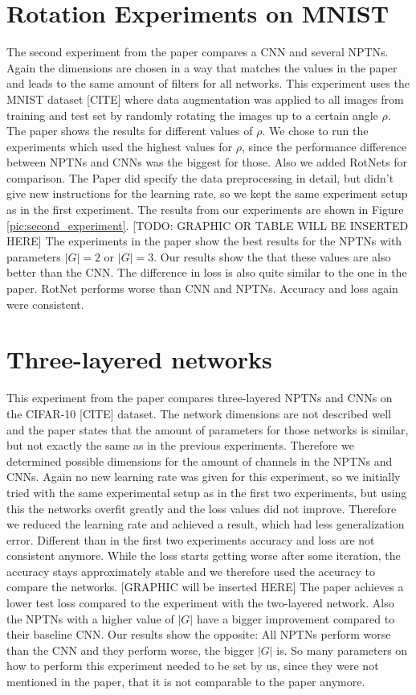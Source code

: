 \documentclass{llncs}
\begin{document}
\section{Rotation Experiments on MNIST}
The second experiment from the paper compares a CNN and several NPTNs. Again the dimensions are chosen in a way that matches the values in the paper and leads to the same amount of filters for all networks. 
This experiment uses the MNIST dataset [CITE] where data augmentation was applied to all images from training and test set by randomly rotating the images up to a certain angle $\rho$. 
The paper shows the results for different values of $\rho$. We chose to run the experiments which used the highest values for $\rho$, since the performance difference between NPTNs and CNNs was the biggest for those. Also we added RotNets for comparison.
The Paper did specify the data preprocessing in detail, but didn't give new instructions for the learning rate, so we kept the same experiment setup as in the first experiment.
The results from our experiments are shown in Figure \ref{pic:second_experiment}. 
[TODO: GRAPHIC OR TABLE WILL BE INSERTED HERE]
The experiments in the paper show the best results for the NPTNs with parameters $|G|=2$ or $|G|=3$. Our results show the that these values are also better than the CNN. The difference in loss is also quite similar to the one in the paper. RotNet performs worse than CNN and NPTNs. Accuracy and loss again were consistent. 

\section{Three-layered networks}
This experiment from the paper compares three-layered NPTNs and CNNs on the CIFAR-10 [CITE] dataset. 
The network dimensions are not described well and the paper states that the amount of parameters for those networks is similar, but not exactly the same as in the previous experiments. 
Therefore we determined possible dimensions for the amount of channels in the NPTNs and CNNs. 
Again no new learning rate was given for this experiment, so we initially tried with the same experimental setup as in the first two experiments, but using this the networks overfit greatly and the loss values did not improve. 
Therefore we reduced the learning rate and achieved a result, which had less generalization error. 
Different than in the first two experiments accuracy and loss are not consistent anymore. While the loss starts getting worse after some iteration, the accuracy stays approximately stable and we therefore used the accuracy to compare the networks.
[GRAPHIC will be inserted HERE]
The paper achieves a lower test loss compared to the experiment with the two-layered network. Also the NPTNs with a higher value of $|G|$ have a bigger improvement compared to their baseline CNN. Our results show the opposite: All NPTNs perform worse than the CNN and they perform worse, the bigger $|G|$ is.
So many parameters on how to perform this experiment needed to be set by us, since they were not mentioned in the paper, that it is not comparable to the paper anymore.
\end{document}
